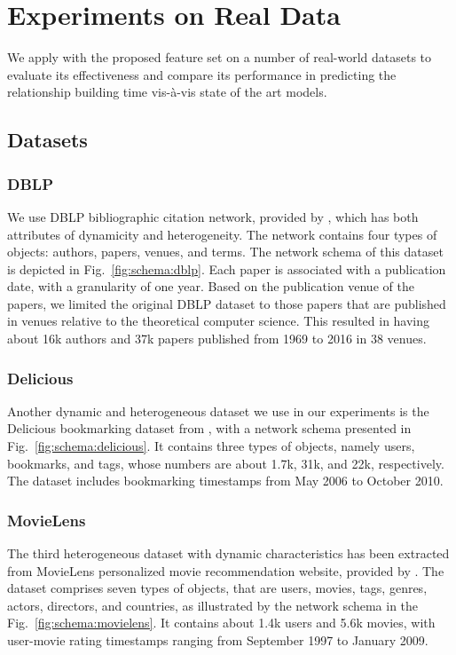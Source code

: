 \section{Experiments on Real Data}\label{sec:results}

We apply \npglm with the proposed feature set on a number of real-world datasets to evaluate its effectiveness and compare its performance in predicting the relationship building time vis-\`a-vis state of the art models. 

\subsection{Datasets}
\subsubsection{DBLP}
We use DBLP bibliographic citation network, provided by \cite{tang2008aminer}, which has both attributes of dynamicity and heterogeneity. The network contains four types of objects: authors, papers, venues, and terms. The network schema of this dataset is depicted in Fig.~\ref{fig:schema:dblp}. Each paper is associated with a publication date, with a granularity of one year. Based on the publication venue of the papers, we limited the original DBLP dataset to those papers that are published in venues relative to the theoretical computer science. This resulted in having about 16k authors and 37k papers published from 1969 to 2016 in 38 venues. 

\subsubsection{Delicious}
Another dynamic and heterogeneous dataset we use in our experiments is the Delicious bookmarking dataset from \cite{Cantador:RecSys2011}, with a network schema presented in Fig.~\ref{fig:schema:delicious}. It contains three types of objects, namely users, bookmarks, and tags, whose numbers are about 1.7k, 31k, and 22k, respectively. The dataset includes bookmarking timestamps from May 2006 to October 2010.

\subsubsection{MovieLens}
The third heterogeneous dataset with dynamic characteristics has been extracted from MovieLens personalized movie recommendation website, provided by \cite{harper2015}. The dataset comprises seven types of objects, that are users, movies, tags, genres, actors, directors, and countries, as illustrated by the network schema in the Fig.~\ref{fig:schema:movielens}. It contains about 1.4k users and 5.6k movies, with user-movie rating timestamps ranging from September 1997 to January 2009.

